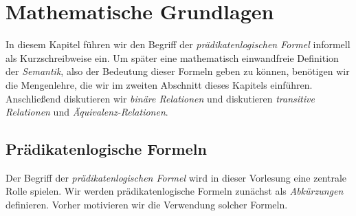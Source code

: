 \chapter{Mathematische Grundlagen} 
In diesem Kapitel führen wir den Begriff der \emph{prädikatenlogischen Formel} informell
als Kurzschreibweise ein.  Um später eine mathematisch einwandfreie Definition der
\emph{Semantik}, also der Bedeutung dieser Formeln geben zu können, benötigen wir die
Mengenlehre, die wir im zweiten Abschnitt dieses Kapitels einführen.  Anschließend
diskutieren wir \emph{binäre Relationen} und diskutieren 
\emph{transitive Relationen} und \emph{Äquivalenz-Relationen}.


\section{Prädikatenlogische Formeln}
Der Begriff der \emph{prädikatenlogischen Formel} wird in dieser Vorlesung eine zentrale
Rolle spielen.  Wir werden prädikatenlogische Formeln zunächst als \emph{Abkürzungen} definieren.  
Vorher motivieren wir die Verwendung solcher Formeln.


